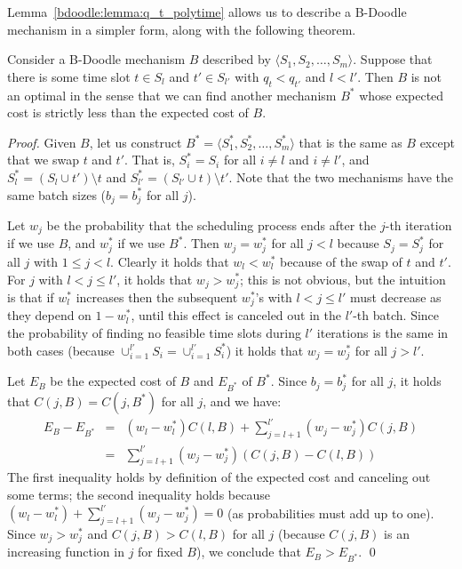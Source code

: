 
Lemma~\ref{bdoodle:lemma:q_t_polytime} allows us to describe a B-Doodle mechanism in a simpler form, along with the following theorem. 
\begin{theorem} \label{bdoodle:thm:swap_argument}
Consider a B-Doodle mechanism $B$ described by $\langle S_1, S_2, \dots, S_m \rangle$. Suppose that there is some time slot $t \in S_l$ and $t'\in S_{l'}$ with $q_t < q_{t'}$ and $l < l'$. Then $B$ is not an optimal in the sense that we can find another mechanism $B^*$ whose expected cost is strictly less than the expected cost of $B$.
\end{theorem}
\begin{proof}
Given $B$, let us construct $B^* = \langle S^*_1, S^*_2, \dots, S^*_m \rangle$ that is the same as $B$ except that we swap $t$ and $t'$. That is, $S^*_i = S_i$ for all $i \neq l$ and $i\neq l'$, and $S^*_{l} = (S_l \cup t') \setminus t$ and $S^*_{l'} = (S_{l'} \cup t) \setminus t'$. Note that the two mechanisms have the same batch sizes ($b_j = b^*_j$ for all $j$). 

Let $w_j$ be the probability that the scheduling process ends after the $j$-th iteration if we use $B$, and $w_j^*$ if we use $B^*$. Then $w_j = w_j^*$ for all $j < l$ because $S_j = S^*_j$ for all $j$ with $1 \leq j < l$. Clearly it holds that $w_l < w_l^*$ because of the swap of $t$ and $t'$. For $j$ with $l < j \leq l'$, it holds that $w_j > w_j^*$; this is not obvious, but the intuition is that if $w_l^*$ increases then the subsequent $w_j^*$'s with $l < j \leq l'$ must decrease as they depend on $1-w_l^*$, until this effect is canceled out in the $l'$-th batch. Since the probability of finding no feasible time slots during $l'$ iterations is the same in both cases (because $\cup_{i=1}^{l'} S_i = \cup_{i=1}^{l'}S^*_i$) it holds that $w_j = w_j^*$ for all $j > l'$. 

Let $E_B$ be the expected cost of $B$ and $E_{B^*}$ of $B^*$. Since $b_j = b^*_j$ for all $j$, it holds that $C(j, B) = C(j, B^*)$ for all $j$, and we have:
\begin{eqnarray*}
	E_B - E_{B^*} 
	&=& (w_l - w_l^*)C(l, B) + \sum_{j=l+1}^{l'} (w_j - w_j^*)C(j, B) \\
	&=& \sum_{j=l+1}^{l'} (w_j - w_j^*)(C(j, B) - C(l, B))
\end{eqnarray*} 
The first inequality holds by definition of the expected cost and canceling out some terms; the second inequality holds because $(w_l - w_l^*) + \sum_{j=l+1}^{l'} (w_j - w_j^*) = 0$ (as probabilities must add up to one). Since $w_j > w_j^*$ and $C(j, B) > C(l, B)$ for all $j$ (because $C(j, B)$ is an increasing function in $j$ for fixed $B$), we conclude that $E_{B} > E_{B^*}$.
\qed
\end{proof}
